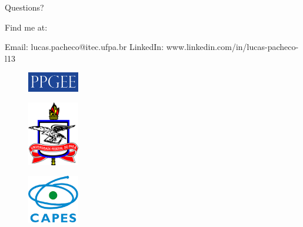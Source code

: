 \documentclass[10pt]{beamer}
\begin{document}
\begin{frame}{Questions?}
\centering

    \vphantom{1in}
	Find me at:
	
	Email: lucas.pacheco@itec.ufpa.br
	LinkedIn: www.linkedin.com/in/lucas-pacheco-l13
	
	\vfill
	
	\begin{multicols}{3}
\vspace*{\fill}
	\begin{figure}
	    \centering
	    \includegraphics[width=0.2\textwidth]{images/ppgee.png}
	\end{figure}
\vspace*{\fill}
	\begin{figure}
	    \centering
	    \includegraphics[width=0.2\textwidth]{images/ufpa.png}
	\end{figure}
	\vspace*{\fill}
	\begin{figure}
	    \centering
	    \includegraphics[width=0.2\textwidth]{images/capes.png}
	\end{figure}
    \vspace*{\fill}
	\end{multicols}
\end{frame}
\end{document}
